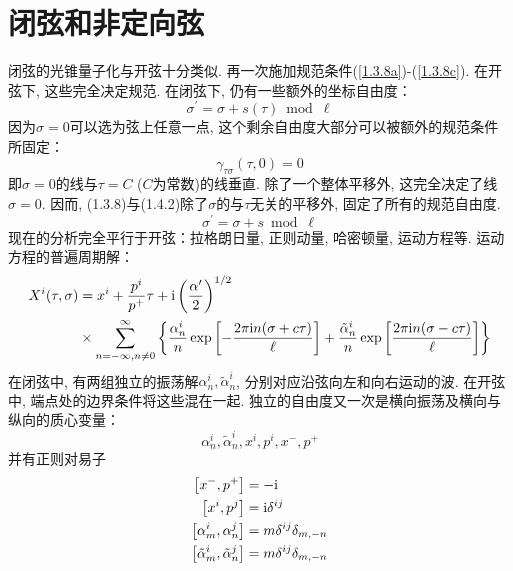 \section{闭弦和非定向弦}%
闭弦的光锥量子化与开弦十分类似. 再一次施加规范条件(\ref{1.3.8a})-(\ref{1.3.8c}). 在开弦下, 这些完全决定规范. 在闭弦下, 仍有一些额外的坐标自由度：
\begin{equation}
\sigma^{\prime}=\sigma+s(\tau) \bmod \ell
\end{equation}
因为$\sigma=0$可以选为弦上任意一点, 这个剩余自由度大部分可以被额外的规范条件所固定：
\begin{equation}
\gamma_{\tau \sigma}(\tau, 0)=0
\end{equation}
即$\sigma=0$的线与$\tau=C$ ($C$为常数)的线垂直. 除了一个整体平移外, 这完全决定了线$\sigma=0$. 因而, (1.3.8)与(1.4.2)除了$\sigma$的与$\tau$无关的平移外, 固定了所有的规范自由度. 
\begin{equation}
\sigma^{\prime}=\sigma+s \bmod \ell   \label{sigma-translation}
\end{equation}
现在的分析完全平行于开弦：拉格朗日量, 正则动量, 哈密顿量, 运动方程等. 运动方程的普遍周期解：
\begin{equation}
\begin{aligned}
X^{i}(\tau, \sigma) &=x^{i}+\frac{p^{i}}{p^{+}} \tau+\mathrm{i}\left(\frac{\alpha^{\prime}}{2}\right)^{1 / 2} \\
& \times \sum_{n=-\infty , n \neq 0}^{\infty}\left\{\frac{\alpha_{n}^{i}}{n} \exp \left[-\frac{2 \pi \mathrm{i} n(\sigma+c \tau)}{\ell}\right]+\frac{\tilde{\alpha}_{n}^{i}}{n} \exp \left[\frac{2 \pi \mathrm{i} n(\sigma-c \tau)}{\ell}\right]\right\} \label{general-periodic-solution}
\end{aligned}
\end{equation}
在闭弦中, 有两组独立的振荡解$\alpha_{n}^{i}, \tilde{\alpha}_{n}^{i}$, 分别对应沿弦向左和向右运动的波. 在开弦中, 端点处的边界条件将这些混在一起. 独立的自由度又一次是横向振荡及横向与纵向的质心变量：
\begin{equation}
\alpha_{n}^{i}, \tilde{\alpha}_{n}^{i}, x^{i}, p^{i}, x^{-}, p^{+}
\end{equation}
并有正则对易子
\begin{subequations}
\begin{align}
\left[x^{-}, p^{+}\right]&=-\mathrm{i} \\
\left[x^{i}, p^{j}\right]&=\mathrm{i} \delta^{i j} \\
\left[\alpha_{m}^{i}, \alpha_{n}^{j}\right]&=m \delta^{i j} \delta_{m,-n} \\
\left[\tilde{\alpha}_{m}^{i}, \tilde{\alpha}_{n}^{j}\right]&=m \delta^{i j} \delta_{m,-n} 
\end{align}
\end{subequations}
